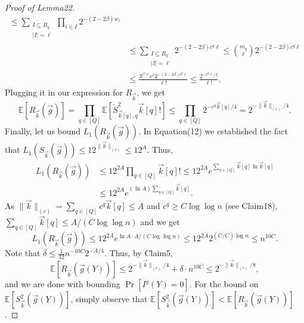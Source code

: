 \begin{proof}[Proof of Lemma22]
\begin{align*}
\le\sum_{\substack{I\subseteq B_q\\|I|=\ell}}\prod_{i\in I}2^{-(2-2\beta)w_i}\\
&\le\sum_{\substack{I\subseteq B_q\\|I|=\ell}}2^{-(2-2\beta)c^q\ell}
\le\binom{m_q}{\ell}2^{-(2-2\beta)c^q\ell}\\
&\le\frac{3^{c^q\ell}e^\ell2^{-(2-2\beta)c^q\ell}}{\ell!}
\le\frac{2^{-c^q\ell/4}}{\ell!}.
\end{align*}
Plugging it in our expression for $R_{\vec k}$, we get
\begin{equation}
\mathbb E[R_{\vec k}(\vec g)]
=\prod_{q\in[Q]}\mathbb E[\check S_{\vec k[q],q}^2\vec k[q]!]
\le\prod_{q\in[Q]}2^{-c^q\vec k[q]/4}=2^{-\|\vec k\|_{(c)}/4}.\tag{13}
\end{equation}
Finally, let us bound $L_1(R_{\vec k}(\vec g))$. In Equation(12) we established the fact that $L_1(S_{\vec k}(\vec g))\le12^{\|\vec k\|_{(c)}}\le12^A$. Thus,
\begin{align*}
L_1(R_{\vec k}(\vec g))
&\le12^{2A}\prod_{q\in[Q]}\vec k[q]!
\le12^{2A}e^{\sum_{q\in[Q]}\vec k[q]\ln\vec k[q]}\\
&\le12^{2A}e^{(\ln A)\sum_{q\in[Q]}\vec k[q]}.
\end{align*}
As $\|\vec k\|_{(c)}=\sum_{q\in[Q]}c^q\vec k[q]\le A$ and $c^q\ge C\log\log n$ (see Claim18), $\sum_{q\in[Q]}\vec k[q]\le A/(C\log\log n)$ and we get
\[
L_1(R_{\vec k}(\vec g))
\le12^{2A}e^{\ln A\cdot A/(C\log\log n)}
\le12^{2A}2^{(\bar C/C)\log n}\le n^{10\bar C}.
\]
Note that $\delta\le\frac1{32}n^{-10\bar C}2^{-A/4}$. Thus, by Claim5,
\[
\mathbb E[R_{\vec k}(\vec g(Y))]
\le2^{-\|\vec k\|_{(c)}/4}+\delta\cdot n^{10\bar C}
\le2^{-\|\vec k\|_{(c)}/8},
\]
and we are done with bounding $\Pr[I^g(Y)=0]$. For the bound on $\mathbb E[S_{\vec k}^2(\vec g(Y))]$, simply observe that $\mathbb E[S_{\vec k}^2(\vec g(Y))]<\mathbb E[R_{\vec k}(\vec g(Y))]$.
\end{proof}
